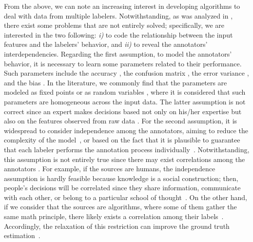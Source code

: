 \documentclass[journal]{IEEEtran}
\begin{document}
From the above, we can note an increasing interest in developing algorithms to deal with data from multiple labelers. Notwithstanding, as was analyzed in \cite{g2019machine}, there exist some problems that are not entirely solved; specifically, we are interested in the two following: \textit{i)} to code the relationship between the input features and the labelers' behavior, and \textit{ii)} to reveal the annotators' interdependencies. Regarding the first assumption, to model the annotators' behavior, it is necessary to learn some parameters related to their performance. Such parameters include the accuracy \cite{rodrigues2013learning}, the confusion matrix \cite{gonzalez2015automatic}, the error variance \cite{raykar2010learning}, and the bias \cite{rodrigues2017learning}. In the literature, we commonly find that the parameters are modeled as fixed points \cite{rodrigues2014gaussian} or as random variables \cite{morales2019scalable}, where it is considered that such parameters are homogeneous across the input data. The latter assumption is not correct since an expert makes decisions based not only on his/her expertise but also on the features observed from raw data \cite{raykar2010learning}. For the second assumption, it is widespread to consider independence among the annotators, aiming to reduce the complexity of the model~\cite{venanzi2014community}, or based on the fact that it is plausible to guarantee that each labeler performs the annotation process individually~\cite{tang2019leveraging}. Notwithstanding, this assumption is not entirely true since there may exist correlations among the annotators \cite{zhang2011learning}. For example, if the sources are humans, the independence assumption is hardly feasible because knowledge is a social construction; then, people's decisions will be correlated since they share information, communicate with each other, or belong to a particular school of thought~\cite{surowiecki2005wisdom,hahn2018communication}. On the other hand, if we consider that the sources are algorithms, where some of them gather the same math principle, there likely exists a correlation among their labels~\cite{zhu2019unsupervised}. Accordingly, the relaxation of this restriction can improve the ground truth estimation~\cite{g2019machine}.
\end{document}
